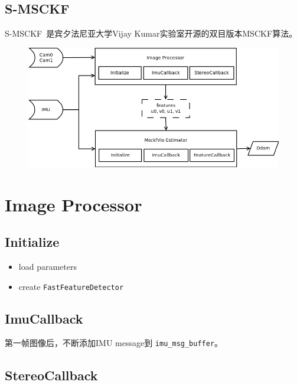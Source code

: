 \documentclass[12pt,a4paper]{article}
\begin{document}
\subsection{S-MSCKF}

S-MSCKF~\cite{sun2018robust}是宾夕法尼亚大学Vijay Kumar实验室开源的双目版本MSCKF算法。


\begin{figure}[H]
\centering
\includegraphics[scale=0.5]{images/msckf_vio_io.png}
\end{figure}

\newpage
\section{Image Processor}

\subsection{Initialize}

\begin{itemize}
\item load parameters
\item create \verb|FastFeatureDetector|
\end{itemize}

\subsection{ImuCallback}

第一帧图像后，不断添加IMU message到 \verb|imu_msg_buffer|。

\subsection{StereoCallback}
\end{document}
